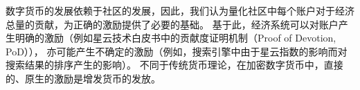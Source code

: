 数字货币的发展依赖于社区的发展，因此，我们认为量化社区中每个账户对于经济总量的贡献，为正确的激励提供了必要的基础。
基于此，经济系统可以对账户产生明确的激励（例如星云技术白皮书中的贡献度证明机制（Proof of Devotion, PoD）），
亦可能产生不确定的激励（例如，搜索引擎中由于星云指数的影响而对搜索结果的排序产生的影响）。
不同于传统货币理论，在加密数字货币中，直接的、原生的激励是增发货币的发放。




\begin{comment}

\subsection{经济激励模型}
完整的讨论经济激励模型，超出了本文的范围，然而，考虑到星云指数可能产生的激励效应，有必要对星云指数之后的经济激励给出必要的说明。

星云指数衡量了一个账户对经济系统的贡献，基于此，经济系统可以对账户产生明确的激励（例如技术白皮书中的贡献度证明机制（Proof of Devotion, PoD），
亦可能产生不确定的激励（例如，搜索引擎中由于星云指数的影响而对搜索结果的排序产生的影响）。在加密数字货币中，直接的、原生的激励是增发货币的发放。

我们认为，加密数字货币的最根本的价值来源于流通，即在更多的交易中产生更多的价值

根据式~\ref{eq:currency}

当社区用户产生价值增幅大于星云币增发幅度时，星云币会对应升值或者星云币流通性增加，即用户交易频率增加，从而达到新的平衡，反之亦然。
因此在计算星云经济系统的产出时，我们采用星云指数作为衡量指标，同时我们希望该指标能够促进星云币流通速度的增加。

星云指数的物理意义是{\textbf 用户对经济系统增长的贡献}。更进一步的，所有用户的星云指数的总和，应该与经济体的整体价值正相关{\color{red} xxx}.
\end{comment}
